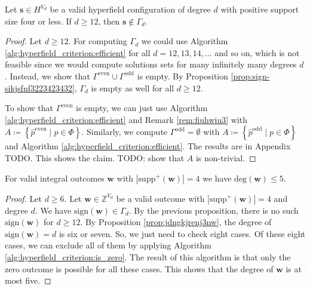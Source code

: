 \begin{proposition}\label{prop:jasndkjsnjsnkjs}
    Let \( \mathbf{s} \in H^{V_d} \) be a valid hyperfield configuration of degree \( d \) with positive support size four or less. If \( d\geq 12 \), then \( \mathbf{s} \notin \Gamma_d \).
\end{proposition}

\begin{proof}
    Let \( d \geq 12 \). For computing \( \Gamma_d \) we could use Algorithm \ref{alg:hyperfield_criterion:efficient} for all \( d = 12, 13, 14, \dots \) and so on, which is not feasible since we would compute solutions sets for many infinitely many degrees \( d \). Instead, we show that \( \Gamma^{\mathrm{even}} \cup \Gamma^{\mathrm{odd}} \) is empty. By Proposition \ref{prop:sign-sikjsfnf3223423432}, \( \Gamma_d \) is empty as well for all \( d\geq 12 \).

    To show that \(  \Gamma^{\mathrm{even}} \) is empty, we can just use Algorithm \ref{alg:hyperfield_criterion:efficient} and Remark \ref{rem:fiuhwiu3} with \(A \coloneqq \left\{ \hat p^{\mathrm{even}} \mid p \in \Phi \right\}\). Similarly, we compute \( \Gamma^{\mathrm{odd}} = \emptyset \) with \(A \coloneqq \left\{ \hat p^{\mathrm{odd}} \mid p \in \Phi \right\}\) and Algorithm \ref{alg:hyperfield_criterion:efficient}. The results are in Appendix TODO. This shows the claim. TODO: show that \( A \) is non-trivial.
\end{proof}

\begin{theorem}\label{thm:main-result-32432432432nkdnjkfd}
    For valid integral outcomes \( \mathbf w \) with \( |\mathrm{supp}^+(\mathbf w)| = 4 \) we have \( \mathrm{deg}(\mathbf w) \leq 5 \).
\end{theorem}

\begin{proof}
    Let \( d \geq 6 \).
    Let \( \mathbf{w} \in \mathbb{Z}^{V_d} \) be a valid outcome with \( |\mathrm{supp}^+(\mathbf w)| = 4 \) and degree \( d \). We have \( \mathrm{sign}(\mathbf{w}) \in \Gamma_d \). By the previous proposition, there is no such \( \mathrm{sign}(\mathbf{w}) \) for \( d \geq 12 \). By Proposition \ref{prop:jdngkjrenj3nw}, the degree of \( \mathrm{sign}(\mathbf{w}) = d \) is six or seven. So, we just need to check eight cases. Of these eight cases, we can exclude all of them by applying Algorithm \ref{alg:hyperfield_criterion:is_zero}. The result of this algorithm is that only the zero outcome is possible for all these cases. This shows that the degree of \( \mathbf{w} \) is at most five.
\end{proof}